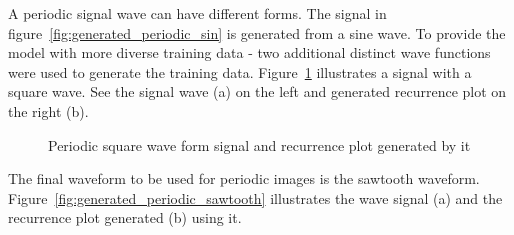 \documentclass[a4paper,12pt,fleqn]{article}
\begin{document}
A periodic signal wave can have different forms.
The signal in figure~\ref{fig:generated_periodic_sin} is generated from a sine wave.
To provide the model with more diverse training data - two additional distinct wave functions were used to generate the training data.
Figure~\ref{fig:generated_periodic_square} illustrates a signal with a square wave. See the signal wave (a) on the left and generated recurrence plot on the right (b).
\begin{figure}
  \centering
  \qquad
  \caption{Periodic square wave form signal and recurrence plot generated by it}
  \label{fig:generated_periodic_square}
\end{figure}
The final waveform to be used for periodic images is the sawtooth waveform.
Figure~\ref{fig:generated_periodic_sawtooth} illustrates the wave signal (a) and the recurrence plot generated (b) using it.
\end{document}
